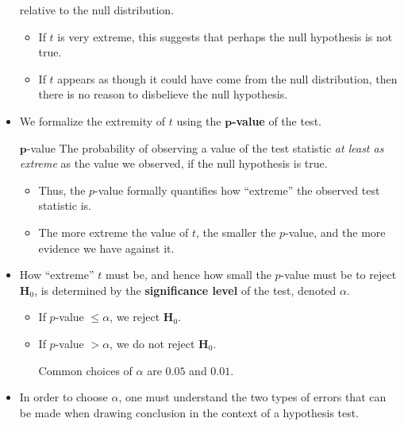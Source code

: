 \begin{itemize}
          relative to the null distribution.
          \begin{itemize}
              \item If $ t $ is very extreme, this suggests that perhaps the null hypothesis
                    is not true.
              \item If $ t $ appears as though it could have come from the null distribution, then
                    there is no reason to disbelieve the null hypothesis.
          \end{itemize}
    \item We formalize the extremity of $ t $ using the \textbf{$ \symbf{p} $-value} of the test.

          \begin{Definition}{$ \symbf{p} $-value}{}
              The probability of observing a value of the test statistic \emph{at least as extreme}
              as the value we observed, if the null hypothesis is true.
          \end{Definition}
          \begin{itemize}
              \item Thus, the $ p $-value formally quantifies how ``extreme'' the observed
                    test statistic is.
              \item The more extreme the value of $ t $, the smaller the $ p $-value, and the more
                    evidence we have against it.
          \end{itemize}
    \item How ``extreme'' $ t $ must be, and hence how small the $ p $-value must be
          to reject $ \mathbf{H}_0 $, is determined by the \textbf{significance level} of the test,
          denoted $ \alpha $.
          \begin{itemize}
              \item If $ p $-value $ \le \alpha $, we reject $ \mathbf{H}_0 $.
              \item If $ p $-value $ >\alpha $, we do not reject $ \mathbf{H}_0 $.
                    \begin{Remark}{}{}
                        Common choices of $ \alpha $ are $ 0.05 $ and $ 0.01 $.
                    \end{Remark}
          \end{itemize}
    \item In order to choose $ \alpha $, one must understand the two types of errors
          that can be made when drawing conclusion in the context of a hypothesis test.

\end{itemize}
